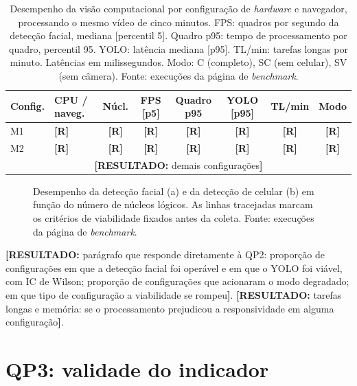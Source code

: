 \documentclass[portuguese,oneside]{tcc}
\newcommand{\estr}[1]{\emph{#1}}
\newcommand{\resultado}[1]{\textcolor{red!70!black}{\textbf{[RESULTADO:} #1\textbf{]}}}
\newcommand{\rr}{\textcolor{red!70!black}{\textbf{[R]}}}
\begin{document}
\begin{table}[htbp]
\centering
\caption{Desempenho da visão computacional por configuração de \estr{hardware} e navegador, processando o mesmo vídeo de cinco minutos. FPS: quadros por segundo da detecção facial, mediana [percentil 5]. Quadro p95: tempo de processamento por quadro, percentil 95. YOLO: latência mediana [p95]. TL/min: tarefas longas por minuto. Latências em milissegundos. Modo: C (completo), SC (sem celular), SV (sem câmera). Fonte: execuções da página de \estr{benchmark}.}
\label{tab:qp2}
\scriptsize
\begin{tabular}{llcccccc}
\toprule
Config. & CPU / naveg. & Núcl. & FPS [p5] & Quadro p95 & YOLO [p95] & TL/min & Modo \\
\midrule
M1 & \rr & \rr & \rr & \rr & \rr & \rr & \rr \\
M2 & \rr & \rr & \rr & \rr & \rr & \rr & \rr \\
\multicolumn{8}{c}{\resultado{demais configurações}} \\
\bottomrule
\end{tabular}
\end{table}

\begin{figure}[htbp]
\centering
{}
\caption{Desempenho da detecção facial (a) e da detecção de celular (b) em função do número de núcleos lógicos. As linhas tracejadas marcam os critérios de viabilidade fixados antes da coleta. Fonte: execuções da página de \estr{benchmark}.}
\label{fig:qp2}
\end{figure}

\resultado{parágrafo que responde diretamente à QP2: proporção de configurações em que a detecção facial foi operável e em que o YOLO foi viável, com IC de Wilson; proporção de configurações que acionaram o modo degradado; em que tipo de configuração a viabilidade se rompeu}. \resultado{tarefas longas e memória: se o processamento prejudicou a responsividade em alguma configuração}.

\section{QP3: validade do indicador}
\end{document}
